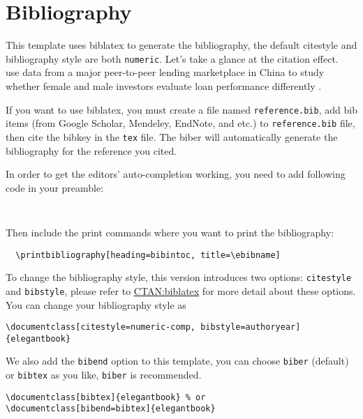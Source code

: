 \documentclass[11pt]{elegantbook}
\begin{document}
\section{Bibliography}

This template uses biblatex to generate the bibliography, the default citestyle and bibliography style are both \lstinline{numeric}. Let's take a glance at the citation effect. ~\cite{en1} use data from a major peer-to-peer lending \cite{en3} marketplace in China to study whether female and male investors evaluate loan performance differently \parencite{en2}. 

If you want to use biblatex, you must create a file named \lstinline{reference.bib}, add bib items (from Google Scholar, Mendeley, EndNote, and etc.) to \lstinline{reference.bib} file, then cite the bibkey in the \lstinline{tex} file. The biber will automatically generate the bibliography for the reference you cited.

In order to get the editors' auto-completion working, you need to add following code in your preamble:

\begin{lstlisting}
  
\end{lstlisting}

Then include the print commands where you want to print the bibliography:
\begin{lstlisting}
  \printbibliography[heading=bibintoc, title=\ebibname]
\end{lstlisting}




To change the bibliography style, this version introduces two options: \lstinline{citestyle} and \lstinline{bibstyle}, please refer to \href{https://ctan.org/pkg/biblatex}{CTAN:biblatex} for more detail about these options. You can change your bibliography style as

\begin{lstlisting}
\documentclass[citestyle=numeric-comp, bibstyle=authoryear]{elegantbook} 
\end{lstlisting}

We also add the \lstinline{bibend} option to this template, you can choose \lstinline{biber} (default) or \lstinline{bibtex} as you like, \lstinline{biber} is recommended.

\begin{lstlisting}
\documentclass[bibtex]{elegantbook} % or
\documentclass[bibend=bibtex]{elegantbook}
\end{lstlisting}
\end{document}
